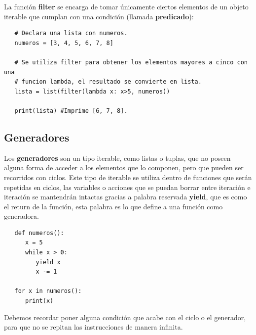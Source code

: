 La función \textbf{filter} se encarga de tomar únicamente ciertos elementos de un objeto iterable que cumplan con una condición (llamada \textbf{predicado}):
\begin{lstlisting}
   # Declara una lista con numeros.
   numeros = [3, 4, 5, 6, 7, 8]
   
   # Se utiliza filter para obtener los elementos mayores a cinco con una
   # funcion lambda, el resultado se convierte en lista.
   lista = list(filter(lambda x: x>5, numeros))
   
   print(lista) #Imprime [6, 7, 8].
\end{lstlisting}


\subsection{Generadores}
\hspace{0.55cm}Los \textbf{generadores} son un tipo iterable, como listas o tuplas, que no poseen alguna forma de acceder a los elementos que lo componen, pero que pueden ser recorridos con ciclos. Este tipo de iterable se utiliza dentro de funciones que serán repetidas en ciclos, las variables o acciones que se puedan borrar entre iteración e iteración se mantendrán intactas gracias a palabra reservada \textbf{yield}, que es como el return de la función, esta palabra es lo que define a una función como generadora.
\begin{lstlisting}
   def numeros():
      x = 5
      while x > 0:
         yield x
         x -= 1
         
   for x in numeros():
      print(x)
\end{lstlisting}

Debemos recordar poner alguna condición que acabe con el ciclo o el generador, para que no se repitan las instrucciones de manera infinita.


